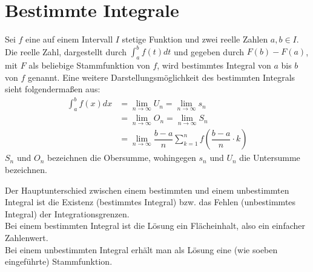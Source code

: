 \section{Bestimmte Integrale}
\begin{Definition}
  Sei $f$ eine auf einem Intervall $I$ stetige Funktion und zwei reelle Zahlen $a,b\in I$. Die reelle Zahl,
  dargestellt durch  $\displaystyle{\int_a^b f(t)dt}$ und gegeben durch $F(b)-F(a)$, mit $F$ als beliebige Stammfunktion von $f$, wird bestimmtes Integral von $a$ bis $b$ von $f$ genannt.
  Eine weitere Darstellungsmöglichkeit des bestimmten Integrals sieht folgendermaßen aus:
  \begin{align*}
    \int_{a}^{b} f(x)dx & = \lim\limits_{n \rightarrow \infty} U_n = \lim\limits_{n \rightarrow \infty} s_n\\
                        & = \lim\limits_{n \rightarrow \infty} O_n = \lim\limits_{n \rightarrow \infty} S_n\\
                        & = \lim\limits_{n \rightarrow \infty} \dfrac{b-a}{n}\sum\limits_{k=1}^{n}f\left(\dfrac{b-a}{n}\cdot k\right)
  \end{align*}
  $S_n$ und $O_n$ bezeichnen die Obersumme, wohingegen $s_n$ und $U_n$ die Untersumme bezeichnen.
\end{Definition}
\begin{Bemerkung}
  Der Hauptunterschied zwischen einem bestimmten und einem unbestimmten Integral ist die Existenz (bestimmtes Integral) bzw. das Fehlen
  (unbestimmtes Integral) der Integrationsgrenzen.\\
  Bei einem bestimmten Integral ist die Lösung ein Flächeinhalt, also ein einfacher Zahlenwert.\\
  Bei einem unbestimmten Integral erhält man als Lösung eine (wie soeben eingeführte) Stammfunktion.
\end{Bemerkung}
